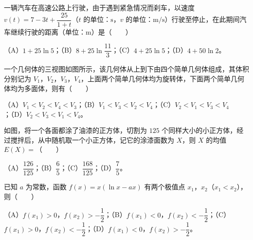 \begin{question}
一辆汽车在高速公路上行驶，由于遇到紧急情况而刹车，以速度 $v(t)=7-3t+\dfrac{25}{1+t}$（$t$ 的单位：$\mathrm s$，$v$ 的单位：$\mathrm{m/s}$）行驶至停止，在此期间汽车继续行驶的距离（单位：$\mathrm m$）是\mbox{（　　）}

（A）$1+25\ln5$；（B）$8+25\ln\dfrac{11}{3}$；（C）$4+25\ln5$；（D）$4+50\ln2$。

\Needspace{0.4\textheight}
\end{question}
\begin{question}
一个几何体的三视图如图所示，该几何体从上到下由四个简单几何体组成，其体积分别记为 $V_1$，$V_2$，$V_3$，$V_4$，上面两个简单几何体均为旋转体，下面两个简单几何体均为多面体，则有\mbox{（　　）}
\nopagebreak[4]
\begin{center}\end{center}
\nopagebreak[4]
（A）$V_1<V_2<V_4<V_3$；（B）$V_1<V_3<V_2<V_4$；（C）$V_2<V_1<V_3<V_4$；（D）$V_2<V_3<V_1<V_4$。

\Needspace{0.4\textheight}
\end{question}
\begin{question}
如图，将一个各面都涂了油漆的正方体，切割为 $125$ 个同样大小的小正方体，经过搅拌后，从中随机取一个小正方体，记它的涂漆面数为 $X$，则 $X$ 的均值 $E(X)=$\mbox{（　　）}
\nopagebreak[4]
\begin{center}\end{center}
\nopagebreak[4]
（A）$\dfrac{126}{125}$；（B）$\dfrac65$；（C）$\dfrac{168}{125}$；（D）$\dfrac75$。

\end{question}
\begin{question}
已知 $a$ 为常数，函数 $f(x)=x(\ln x-ax)$ 有两个极值点 $x_1$，$x_2$（$x_1<x_2$），则\mbox{（　　）}

（A）$f(x_1)>0$，$f(x_2)>-\dfrac12$；（B）$f(x_1)<0$，$f(x_2)<-\dfrac12$；（C）$f(x_1)>0$，$f(x_2)<-\dfrac12$；（D）$f(x_1)<0$，$f(x_2)>-\dfrac12$。

\end{question}

